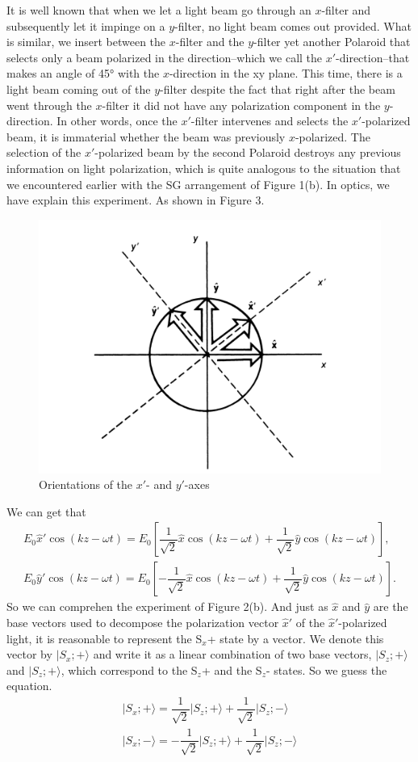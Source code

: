 \documentclass[a4paper]{article}
\newcommand{\ket}[1]{\big|  #1 \big \rangle }
\begin{document}
It is well known that when we let a light beam go through an $x$-filter and subsequently let it impinge on a $y$-filter, no light beam comes out provided. What is similar, we insert between the $x$-filter and the $y$-filter yet another Polaroid that selects only a beam polarized in the direction--which we call the $x'$-direction--that makes an angle of 45° with the $x$-direction in the xy plane. This time,  there is a light beam coming out of the $y$-filter despite the fact that right after the beam went through the $x$-filter it did not have any polarization component in the $y$-direction. In other words, once the $x'$-filter intervenes and selects the $x'$-polarized beam, it is immaterial whether the beam was previously $x$-polarized. The selection of the $x'$-polarized beam by the second Polaroid destroys any previous information on light polarization, which is quite analogous to the situation that we encountered earlier with the SG arrangement of Figure 1(b).
In optics, we have explain this experiment. As shown in Figure 3.
\begin{figure}[htbp!] \label{x'and y'}
\centering %
    \includegraphics[width=0.5\linewidth]{change axes.jpg}
    \caption{Orientations of the $x'$- and $y'$-axes}
\end{figure}
We can get that
\begin{eqnarray}
E_0 \hat{x} ' \cos(kz-\omega t) = E_0 [ \dfrac{1}{\sqrt{2}} \hat{x} \cos(kz-\omega t) + \dfrac{1}{\sqrt{2}} \hat{y} \cos(kz-\omega t) ],\\
E_0 \hat{y} ' \cos(kz-\omega t) = E_0 [ - \dfrac{1}{\sqrt{2}} \hat{x} \cos(kz-\omega t) + \dfrac{1}{\sqrt{2}} \hat{y} \cos(kz-\omega t) ].
\end{eqnarray}
So we can comprehen the experiment of Figure 2(b). And just as $\hat{x}$ and $\hat{y}$ are the base vectors used to decompose the polarization vector $\hat{x}'$ of the $\hat{x}'$-polarized light, it is reasonable to represent the S$_x$+ state by a vector. We denote this vector by $\vert S_x;+\rangle$ and write it as a linear combination of two base vectors, $\vert S_z;+\rangle$ and $\vert S_z;+\rangle$, which correspond to the S$_z$+ and the S$_z$- states. So we guess the equation.
\begin{eqnarray}
\ket{S_x;+} = \dfrac{1}{\sqrt{2}} \ket{S_z;+} + \dfrac{1}{\sqrt{2}} \ket{S_z;-}\\
\ket{S_x;-} = -\dfrac{1}{\sqrt{2}} \ket{S_z;+} + \dfrac{1}{\sqrt{2}} \ket{S_z;-}\\
\end{eqnarray}
\end{document}

